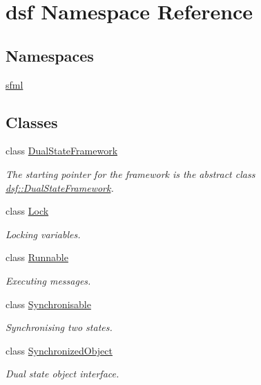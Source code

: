 \hypertarget{namespacedsf}{}\section{dsf Namespace Reference}
\label{namespacedsf}
\subsection*{Namespaces}
\begin{DoxyCompactItemize}
\item 
 \hyperlink{namespacedsf_1_1sfml}{sfml}
\end{DoxyCompactItemize}
\subsection*{Classes}
\begin{DoxyCompactItemize}
\item 
class \hyperlink{classdsf_1_1_dual_state_framework}{Dual\+State\+Framework}
\begin{DoxyCompactList}\small\item\em The starting pointer for the framework is the abstract class \hyperlink{classdsf_1_1_dual_state_framework}{dsf\+::\+Dual\+State\+Framework}. \end{DoxyCompactList}\item 
class \hyperlink{classdsf_1_1_lock}{Lock}
\begin{DoxyCompactList}\small\item\em Locking variables. \end{DoxyCompactList}\item 
class \hyperlink{classdsf_1_1_runnable}{Runnable}
\begin{DoxyCompactList}\small\item\em Executing messages. \end{DoxyCompactList}\item 
class \hyperlink{classdsf_1_1_synchronisable}{Synchronisable}
\begin{DoxyCompactList}\small\item\em Synchronising two states. \end{DoxyCompactList}\item 
class \hyperlink{classdsf_1_1_synchronized_object}{Synchronized\+Object}
\begin{DoxyCompactList}\small\item\em Dual state object interface. \end{DoxyCompactList}\item 

\end{DoxyCompactItemize}
